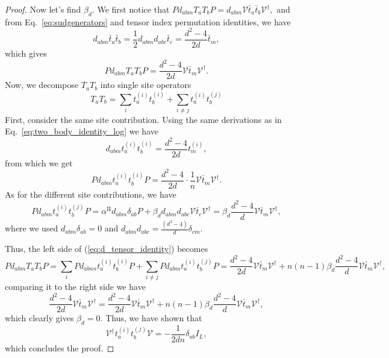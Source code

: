 \documentclass[11pt,letterpaper]{article}
\theoremstyle{plain}
\theoremstyle{plain}
\theoremstyle{plain}
\theoremstyle{plain}
\theoremstyle{plain}
\theoremstyle{plain}
\theoremstyle{plain}
\theoremstyle{definition}
\theoremstyle{plain}
\begin{document}
\begin{proof}
Now let's find $\beta_{d}$. We first notice that
$
    P d_{a b m} T_a T_b P=d_{a b m} \mathcal{V} \bar{t}_a \bar{t}_b \mathcal{V}^{\dagger},
$
and from Eq.~\eqref{eq:sudgenerators} and tensor index permutation identities, we have
\begin{equation}\label{eq:two_body_identity_log}
    d_{a b m} \bar{t}_a \bar{t}_b=\frac{1}{2} d_{a b m} d_{a b c} \bar{t}_c=\frac{d^2-4}{2 d} \bar{t}_m,
\end{equation}
which gives
\begin{equation}\label{eq:d_tensor_identity}
    P d_{a b m} T_a T_b P=\frac{d^2-4}{2 d} \mathcal{V}\bar{t}_m \mathcal{V}^{\dagger}.
\end{equation}
Now, we decompose $T_a T_b$ into single site operators 
\[
    T_a T_b=\sum_i t_a^{(i)} t_b^{(i)}+\sum_{i \neq j} t_a^{(i)} t_b^{(j)}
\]
First, consider the same site contribution. Using the same derivations as in Eq.~\eqref{eq:two_body_identity_log} we have
\[
    d_{a b m} t_a^{(i)} t_b^{(i)}=\frac{d^2-4}{2 d} t_m^{(i)},
\]
from which we get
\[
    P d_{a b m} t_a^{(i)} t_b^{(i)} P=\frac{d^2-4}{2 d} \cdot \frac{1}{n} \mathcal{V}\bar{t}_m \mathcal{V}^{\dagger}.
\]
As for the different site contributions, we have
\[
    P d_{a b m} t_a^{(i)} t_b^{(j)} P=\alpha^{\text{II}} d_{a b m} \delta_{a b} P+\beta_{d} d_{a b m} d_{a bc} \mathcal{V} \bar{t}_c \mathcal{V}^{\dagger}=\beta_{d} \frac{d^2-4}{d} \mathcal{V} \bar{t}_m \mathcal{V}^{\dagger},
\]
where we used $d_{a b m} \delta_{a b}=0$ and $d_{a b m} d_{a b c}=\frac{\left(d^2-4\right)}{d} \delta_{cm}$.

Thus, the left side of (\ref{eq:d_tensor_identity}) becomes
\[
    P d_{a b m} T_a T_b P=\sum_i P d_{a b n n} t_a^{(i)} t_b^{(i)} P+\sum_{i \neq j} P d_{a b m} t_a^{(i)} t_b^{(j)} P=\frac{d^2-4}{2 d} 
    \mathcal{V}\bar{t}_m \mathcal{V}^{\dagger}+n(n-1) \beta_{d} \frac{d^2-4}{d} \mathcal{V} \bar{t}_m \mathcal{V}^{\dagger},
\]
comparing it to the right side we have
\[
\frac{d^2-4}{2 d} \mathcal{V}\bar{t}_m \mathcal{V}^{\dagger}=\frac{d^2-4}{2 d} \mathcal{V}\bar{t}_m \mathcal{V}^{\dagger}+n(n-1) \beta_{d} \frac{d^2-4}{d} \mathcal{V} \bar{t}_m \mathcal{V}^{\dagger},
\]
which clearly gives $\beta_{d}=0$. Thus, we have shown that
\[
    \mathcal{V}^{\dagger} t_a^{(i)} t_b^{(j)} \mathcal{V}=-\frac{1}{2 d n} \delta_{a b} I_L,
\]
which concludes the proof.
\end{proof}
\end{document}
